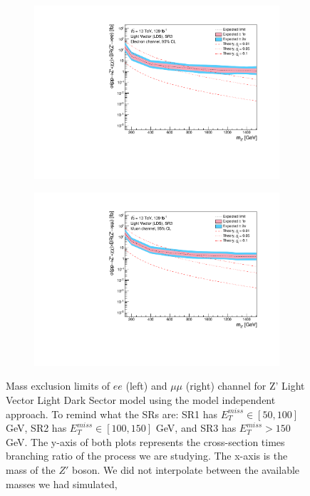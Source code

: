 \documentclass[12pt, a4paper]{book}
\begin{document}
\begin{figure}[!ht]
\begin{subfigure}[b]{0.49\textwidth}
      \includegraphics[width=1\textwidth]{Limits/Model_independent/150/LV_LDS/mass_exclusion_ee.pdf}
   \end{subfigure}
   \hfill
   \begin{subfigure}[b]{0.49\textwidth}
      \centering
      \includegraphics[width=1\textwidth]{Limits/Model_independent/150/LV_LDS/mass_exclusion_uu.pdf}
   \end{subfigure}
   \caption[Expected mass exclusion limits results for LV LDS model on $ee$ and $\mu\mu$ channel using the model independent approach]{Mass exclusion limits of $ee$ (left) and $\mu\mu$ (right) channel for Z' Light Vector Light Dark Sector model using the model independent approach. To remind what the SRs are: SR1 has $E_T^{miss}\in[50, 100]$ GeV, SR2 has $E_T^{miss}\in[100, 150]$ GeV, and SR3 has $E_T^{miss}>150$ GeV. The y-axis of both plots represents the cross-section times branching ratio of the process we are studying. The x-axis is the mass of the $Z'$ boson. We did not interpolate between the available masses we had simulated, 
}
\end{figure}
\end{document}
